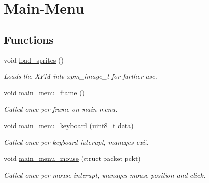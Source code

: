 \hypertarget{group__Main-Menu}{}\section{Main-\/\+Menu}
\label{group__Main-Menu}
\subsection*{Functions}
\begin{DoxyCompactItemize}
\item 
void \hyperlink{group__Main-Menu_ga26d3dd4d93472051b4e0bb50e319494b}{load\+\_\+sprites} ()
\begin{DoxyCompactList}\small\item\em Loads the X\+PM into xpm\+\_\+image\+\_\+t for further use. \end{DoxyCompactList}\item 
void \hyperlink{group__Main-Menu_gab084ce5f50d30f5b66396d4afa61f3a0}{main\+\_\+menu\+\_\+frame} ()
\begin{DoxyCompactList}\small\item\em Called once per frame on main menu. \end{DoxyCompactList}\item 
void \hyperlink{group__Main-Menu_gaa455d5f53d6465e1e8c467bbc1231f47}{main\+\_\+menu\+\_\+keyboard} (uint8\+\_\+t \hyperlink{group__Proj_ga325819a8e492ac69542e8b31705af6e9}{data})
\begin{DoxyCompactList}\small\item\em Called once per keyboard interupt, manages exit. \end{DoxyCompactList}\item 
void \hyperlink{group__Main-Menu_ga4a8e0e77f8775d3742bbda1b8c48fd3c}{main\+\_\+menu\+\_\+mouse} (struct packet pckt)
\begin{DoxyCompactList}\small\item\em Called once per mouse interupt, manages mouse position and click. \end{DoxyCompactList}\end{DoxyCompactItemize}
